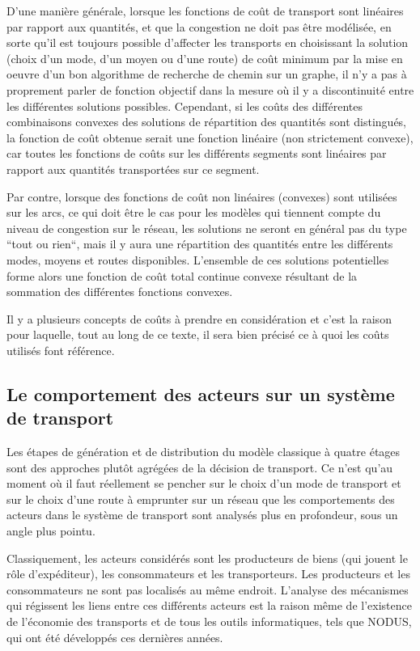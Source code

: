 D'une manière générale, lorsque les fonctions de coût de transport sont
linéaires par rapport aux quantités, et que la congestion ne doit pas être
modélisée, en sorte qu'il est toujours possible d'affecter les transports en
choisissant la solution (choix d'un mode, d'un moyen ou d'une route) de coût
minimum par la mise en oeuvre d'un bon algorithme de recherche de chemin sur un
graphe, il n'y a pas à proprement parler de fonction objectif dans la mesure où
il y a discontinuité entre les différentes solutions possibles. Cependant, si
les coûts des différentes combinaisons convexes des solutions de répartition des
quantités sont distingués, la fonction de coût obtenue serait une fonction
linéaire (non strictement convexe), car toutes les fonctions de coûts sur les
différents segments sont linéaires par rapport aux quantités transportées sur ce
segment.

Par contre, lorsque des fonctions de coût non linéaires (convexes)
sont utilisées sur les arcs, ce qui doit être le cas pour les
modèles qui tiennent compte du niveau de congestion sur le réseau,
les solutions ne seront en général pas du type ``tout ou rien``,
mais il y aura une répartition des quantités entre les différents
modes, moyens et routes disponibles. L'ensemble de ces solutions
potentielles forme alors une fonction de coût total continue
convexe résultant de la sommation des différentes fonctions
convexes.



Il y a plusieurs concepts de coûts à prendre en considération et c'est la raison
pour laquelle, tout au long de ce texte, il sera bien précisé ce à quoi les
coûts utilisés font référence.



\subsection{Le comportement des acteurs sur un syst\`eme de transport}

Les étapes de génération et de distribution du modèle classique à
quatre étages sont des approches plutôt agrégées de la décision de
transport. Ce n'est qu'au moment où il faut réellement se pencher
sur le choix d'un mode de transport et sur le choix d'une route à
emprunter sur un réseau que les comportements des acteurs dans le
système de transport sont analysés plus en profondeur, sous un
angle plus pointu.

Classiquement, les acteurs considérés sont les producteurs de biens (qui jouent
le rôle d'expéditeur), les consommateurs et les transporteurs. Les producteurs
et les consommateurs ne sont pas localisés au même endroit. L'analyse des
mécanismes qui régissent les liens entre ces différents acteurs est la raison
même de l'existence de l'économie des transports et de tous les outils
informatiques, tels que NODUS, qui ont été développés ces dernières années.


